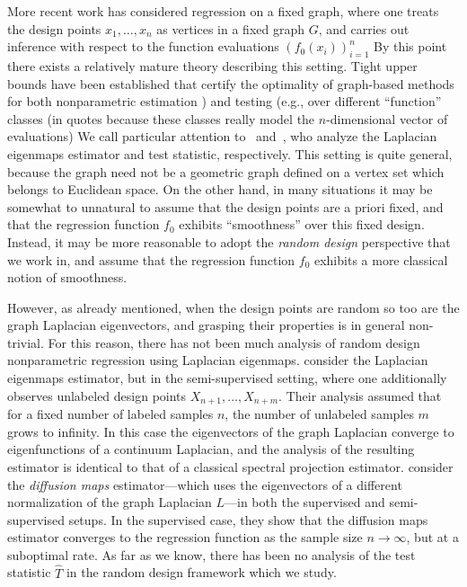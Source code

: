 \documentclass{article}
\newcommand{\1}{\mathbf{1}}
\newcommand{\wh}[1]{\widehat{#1}}
\theoremstyle{alden}
\theoremstyle{aldenthm}
\theoremstyle{definition}
\theoremstyle{remark}
\begin{document}
More recent work has considered regression on a fixed graph, where one treats the design points $x_1,\ldots,x_n$ as vertices in a fixed graph $G$, and carries out inference with respect to the function evaluations $(f_0(x_i))_{i = 1}^{n}$ By this point there exists a relatively mature theory describing this setting. Tight upper bounds have been established that certify the optimality of graph-based methods for both nonparametric estimation \citep{wang2016,hutter2016,sadhanala16,sadhanala17,kirichenko2017,kirichenko2018}) and testing (e.g., \citet{sharpnack2010identifying,sharpnack2013b,sharpnack2013,sharpnack2015} over different ``function'' classes (in quotes because these classes really model the $n$-dimensional vector of evaluations) We call particular attention to~\citet{sadhanala16} and~\citet{sharpnack2015}, who analyze the Laplacian eigenmaps estimator and test statistic, respectively. This setting is quite general, because the graph need not be a geometric graph defined on a vertex set which belongs to Euclidean space. On the other hand, in many situations it may be somewhat to unnatural to assume that the design points are a priori fixed, and that the regression function $f_0$ exhibits ``smoothness'' over this fixed design. Instead, it may be more reasonable to adopt the \emph{random design} perspective that we work in, and assume that the regression function $f_0$ exhibits a more classical notion of smoothness. 

However, as already mentioned, when the design points are random so too are the graph Laplacian eigenvectors, and grasping their properties is in general non-trivial. For this reason, there has not been much analysis of random design nonparametric regression using Laplacian eigenmaps. \cite{zhou2011} consider the Laplacian eigenmaps estimator, but in the semi-supervised setting, where one additionally observes unlabeled design points $X_{n + 1},\ldots,X_{n + m}$. Their analysis assumed that for a fixed number of labeled samples $n$, the number of unlabeled samples $m$ grows to infinity. In this case the eigenvectors of the graph Laplacian converge to eigenfunctions of a continuum Laplacian, and the analysis of the resulting estimator is identical to that of a classical spectral projection estimator. \cite{lee2016} consider the \emph{diffusion maps} estimator---which uses the eigenvectors of a different normalization of the graph Laplacian $L$---in both the supervised and semi-supervised setups. In the supervised case, they show that the diffusion maps estimator converges to the regression function as the sample size $n \to \infty$, but at a suboptimal rate. As far as we know, there has been no analysis of the test statistic $\wh{T}$ in the random design framework which we study.
\end{document}
